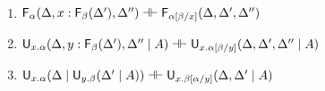 \begin{lemma}[Fusion] ~ \label{lem:fusion}
\begin{enumerate} 

\item $\mathsf{F}_{\alpha}(\Delta,x:\mathsf{F}_{\beta}(\Delta'),\Delta'') \dashv \vdash
  \mathsf{F}_{\alpha[\beta/x]}(\Delta,\Delta',\Delta'')$

\item $\mathsf{U}_{x.\alpha}(\Delta,y:\mathsf{F}_{\beta}(\Delta'),\Delta'' \mid A) \dashv \vdash
  \mathsf{U}_{x.\alpha[\beta/y]}(\Delta,\Delta',\Delta'' \mid A)$

\item 
$\mathsf{U}_{x.\alpha}(\Delta \mid \mathsf{U}_{y.\beta}(\Delta' \mid A)) \dashv \vdash
 \mathsf{U}_{x.\beta[\alpha/y]}(\Delta,\Delta' \mid A)$

\end{enumerate}
\end{lemma}

